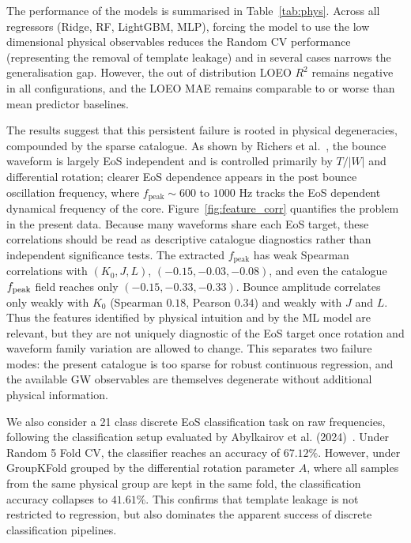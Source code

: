 \documentclass[reprint,aps,prd,floatfix,nofootinbib,superscriptaddress,showpacs]{revtex4-2}
\begin{document}
The performance of the models is summarised in Table~\ref{tab:phys}. Across all regressors (Ridge, RF, LightGBM, MLP), forcing the model to use the low dimensional physical observables reduces the Random CV performance (representing the removal of template leakage) and in several cases narrows the generalisation gap. However, the out of distribution LOEO $R^2$ remains negative in all configurations, and the LOEO MAE remains comparable to or worse than mean predictor baselines. 

The results suggest that this persistent failure is rooted in physical degeneracies, compounded by the sparse catalogue. As shown by Richers et al.~\cite{richers2017}, the bounce waveform is largely EoS independent and is controlled primarily by $T/|W|$ and differential rotation; clearer EoS dependence appears in the post bounce oscillation frequency, where $f_{\text{peak}}\sim 600$ to $1000$ Hz tracks the EoS dependent dynamical frequency of the core. Figure~\ref{fig:feature_corr} quantifies the problem in the present data. Because many waveforms share each EoS target, these correlations should be read as descriptive catalogue diagnostics rather than independent significance tests. The extracted $f_{\text{peak}}$ has weak Spearman correlations with $(K_0,J,L)$, $(-0.15,-0.03,-0.08)$, and even the catalogue $f_{\rm peak}$ field reaches only $(-0.15,-0.33,-0.33)$. Bounce amplitude correlates only weakly with $K_0$ (Spearman $0.18$, Pearson $0.34$) and weakly with $J$ and $L$. Thus the features identified by physical intuition and by the ML model are relevant, but they are not uniquely diagnostic of the EoS target once rotation and waveform family variation are allowed to change. This separates two failure modes: the present catalogue is too sparse for robust continuous regression, and the available GW observables are themselves degenerate without additional physical information.

We also consider a 21 class discrete EoS classification task on raw frequencies, following the classification setup evaluated by Abylkairov et al. (2024)~\cite{abylkairov2024}. Under Random 5 Fold CV, the classifier reaches an accuracy of $67.12\%$. However, under GroupKFold grouped by the differential rotation parameter $A$, where all samples from the same physical group are kept in the same fold, the classification accuracy collapses to $41.61\%$. This confirms that template leakage is not restricted to regression, but also dominates the apparent success of discrete classification pipelines.
\end{document}
